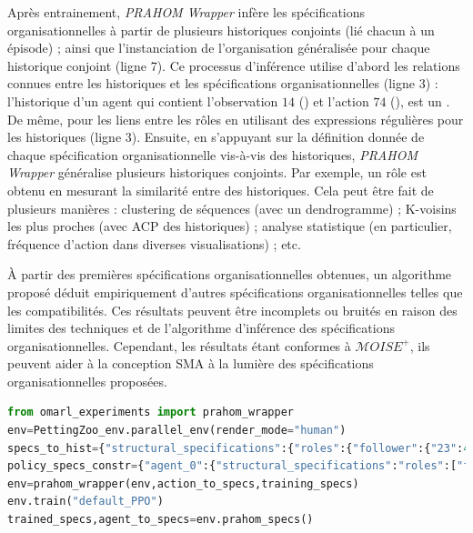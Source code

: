 \documentclass[contribution]{jfsma}
\newcounter{relation}
\begin{document}
Après entrainement, \emph{PRAHOM Wrapper} infère les spécifications organisationnelles à partir de plusieurs historiques conjoints (lié chacun à un épisode) ; ainsi que l'instanciation de l'organisation généralisée pour chaque historique conjoint (ligne 7).
Ce processus d'inférence utilise d'abord les relations connues entre les historiques et les spécifications organisationnelles (ligne 3) : l'historique d'un agent qui contient l'observation $14$ () et l'action $74$ (), est un . De même, pour les liens entre les rôles en utilisant des expressions régulières pour les historiques (ligne 3).
%
Ensuite, en s'appuyant sur la définition donnée de chaque spécification organisationnelle vis-à-vis des historiques, \emph{PRAHOM Wrapper} généralise plusieurs historiques conjoints.
%
Par exemple, un rôle est obtenu en mesurant la similarité entre des historiques. Cela peut être fait de plusieurs manières : clustering de séquences (avec un dendrogramme) ; K-voisins les plus proches (avec ACP des historiques) ; analyse statistique (en particulier, fréquence d'action dans diverses visualisations) ; etc.

À partir des premières spécifications organisationnelles obtenues, un algorithme proposé déduit empiriquement d'autres spécifications organisationnelles telles que les compatibilités.
Ces résultats peuvent être incomplets ou bruités en raison des limites des techniques et de l'algorithme d'inférence des spécifications organisationnelles. Cependant, les résultats étant conformes à $\mathcal{M}OISE^+$, ils peuvent aider à la conception SMA à la lumière des spécifications organisationnelles proposées.

\begin{lstlisting}[language=Python, caption={Utilisation basique de \emph{PRAHOM Wrapper}}, label={lst:wrapper_basic_use}]
from omarl_experiments import prahom_wrapper
env=PettingZoo_env.parallel_env(render_mode="human")
specs_to_hist={"structural_specifications":{"roles":{"follower":{"23":41,"14":[74,0]}}...},"functional_specifications":{"links":{"(leader,follower,aut)":".*14.*?89"}...}...}
policy_specs_constr={"agent_0":{"structural_specifications":"roles":["follower"]}}
env=prahom_wrapper(env,action_to_specs,training_specs)
env.train("default_PPO")
trained_specs,agent_to_specs=env.prahom_specs()
\end{lstlisting}
\end{document}
